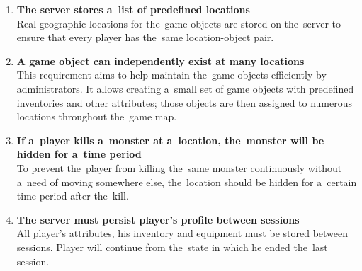 \begin{enumerate}
			\item \textbf{The server stores a~list of predefined locations} \\	
			Real geographic locations for the~game objects are stored on the~server to ensure that every player has the~same location-object pair. 
								
			\item \textbf{A game object can independently exist at many locations} \\
			This requirement aims to help maintain the~game objects efficiently by administrators. It allows creating a~small set of game objects with predefined inventories and other attributes; those objects are then assigned to numerous locations throughout the~game map.
			
			\item \textbf{If a~player kills a~monster at a~location, the~monster will be hidden for a~time period} \\
			To prevent the~player from killing the~same monster continuously without a~need of moving somewhere else, the~location should be hidden for a~certain time period after the~kill.						
					
			\item \textbf{The server must persist player’s profile between sessions} \\
			All player's attributes, his inventory and equipment must be stored between sessions. Player will continue from the~state in which he ended the~last session.
			
		\end{enumerate}
